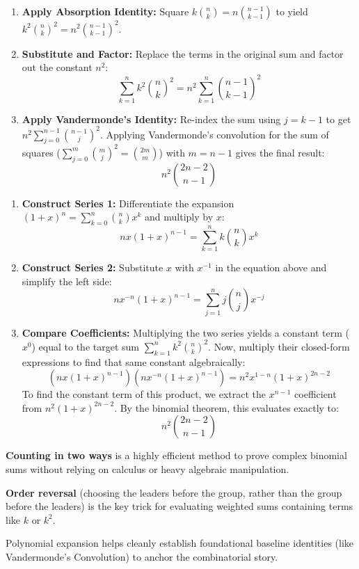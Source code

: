 \begin{solution}
\begin{enumerate}[label=\arabic*., leftmargin=*]
    \item \textbf{Apply Absorption Identity:} Square $k \binom{n}{k} = n \binom{n-1}{k-1}$ to yield $k^2 \binom{n}{k}^2 = n^2 \binom{n-1}{k-1}^2$.
    \item \textbf{Substitute and Factor:} Replace the terms in the original sum and factor out the constant $n^2$:
    $$\sum_{k=1}^{n} k^2 \binom{n}{k}^2 = n^2 \sum_{k=1}^{n} \binom{n-1}{k-1}^2$$
    \item \textbf{Apply Vandermonde's Identity:} Re-index the sum using $j = k - 1$ to get $n^2 \sum_{j=0}^{n-1} \binom{n-1}{j}^2$. Applying Vandermonde's convolution for the sum of squares ($\sum_{j=0}^{m} \binom{m}{j}^2 = \binom{2m}{m}$) with $m = n - 1$ gives the final result:
    $$n^2 \binom{2n-2}{n-1}$$
\end{enumerate}
\end{solution}

\begin{solution}
\begin{enumerate}[label=\arabic*., leftmargin=*]
    \item \textbf{Construct Series 1:} Differentiate the expansion $(1+x)^n = \sum_{k=0}^{n} \binom{n}{k} x^k$ and multiply by $x$:
    $$nx(1+x)^{n-1} = \sum_{k=1}^{n} k \binom{n}{k} x^k$$
    \item \textbf{Construct Series 2:} Substitute $x$ with $x^{-1}$ in the equation above and simplify the left side:
    $$nx^{-n}(1+x)^{n-1} = \sum_{j=1}^{n} j \binom{n}{j} x^{-j}$$
    \item \textbf{Compare Coefficients:} Multiplying the two series yields a constant term ($x^0$) equal to the target sum $\sum_{k=1}^{n} k^2 \binom{n}{k}^2$. Now, multiply their closed-form expressions to find that same constant algebraically:
    $$\left(nx(1+x)^{n-1}\right) \left(nx^{-n}(1+x)^{n-1}\right) = n^2 x^{1-n} (1+x)^{2n-2}$$
    To find the constant term of this product, we extract the $x^{n-1}$ coefficient from $n^2(1+x)^{2n-2}$. By the binomial theorem, this evaluates exactly to:
    $$n^2 \binom{2n-2}{n-1}$$
\end{enumerate}
\end{solution}

\begin{takeaways}
      \item \textbf{Counting in two ways} is a highly efficient method to prove complex binomial sums without relying on calculus or heavy algebraic manipulation.
      \item \textbf{Order reversal} (choosing the leaders before the group, rather than the group before the leaders) is the key trick for evaluating weighted sums containing terms like $k$ or $k^2$. 
      \item Polynomial expansion helps cleanly establish foundational baseline identities (like Vandermonde's Convolution) to anchor the combinatorial story.
\end{takeaways}

